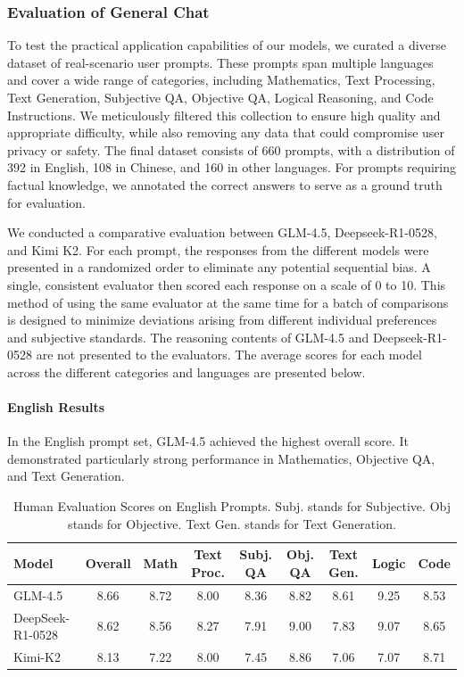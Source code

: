 \documentclass{article}
\theoremstyle{definition}
\begin{document}
\subsubsection{Evaluation of General Chat}
To test the practical application capabilities of our models, we curated a diverse dataset of real-scenario user prompts. These prompts span multiple languages and cover a wide range of categories, including Mathematics, Text Processing, Text Generation, Subjective QA, Objective QA, Logical Reasoning, and Code Instructions. We meticulously filtered this collection to ensure high quality and appropriate difficulty, while also removing any data that could compromise user privacy or safety. The final dataset consists of 660 prompts, with a distribution of 392 in English, 108 in Chinese, and 160 in other languages. For prompts requiring factual knowledge, we annotated the correct answers to serve as a ground truth for evaluation.

We conducted a comparative evaluation between GLM-4.5, Deepseek-R1-0528, and Kimi K2. For each prompt, the responses from the different models were presented in a randomized order to eliminate any potential sequential bias. A single, consistent evaluator then scored each response on a scale of 0 to 10. This method of using the same evaluator at the same time for a batch of comparisons is designed to minimize deviations arising from different individual preferences and subjective standards. The reasoning contents of GLM-4.5 and Deepseek-R1-0528 are not presented to the evaluators.
The average scores for each model across the different categories and languages are presented below.

\paragraph{English Results}
In the English prompt set, GLM-4.5 achieved the highest overall score. It demonstrated particularly strong performance in Mathematics, Objective QA, and Text Generation.
\begin{table}[h!]
\centering
\caption{Human Evaluation Scores on English Prompts. Subj. stands for Subjective. Obj stands for Objective. Text Gen. stands for Text Generation.}
\label{tab:eng-results}
\footnotesize
\begin{tabular}{@{}l@{}cccccccc@{}}
\toprule
\textbf{Model} & \textbf{Overall} & \textbf{Math} & \textbf{Text Proc.} & \textbf{Subj. QA} & \textbf{Obj. QA} & \textbf{Text Gen.} & \textbf{Logic}& \textbf{Code} \\
\midrule
GLM-4.5 & 8.66 & 8.72 & 8.00 & 8.36 & 8.82 & 8.61 & 9.25 & 8.53 \\
DeepSeek-R1-0528 & 8.62 & 8.56 & 8.27 & 7.91 & 9.00 & 7.83 &9.07 & 8.65 \\
Kimi-K2 & 8.13 & 7.22 & 8.00 & 7.45 & 8.86 & 7.06 &7.07 & 8.71 \\
\bottomrule
\end{tabular}
\end{table}
\end{document}
